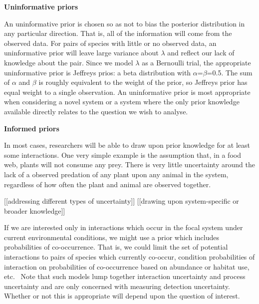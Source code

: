 \documentclass[12pt]{article}
\begin{document}
\begin{spacing}{2.0}
      \textbf{Uninformative priors}

        An uninformative prior is chosen so as not to bias the posterior distribution in any particular direction. That is, all of the information will come from the observed data. For pairs of species with little or no observed data, an uninformative prior will leave large variance about $\lambda$ and reflect our lack of knowledge about the pair. Since we model $\lambda$ as a Bernoulli trial, the appropriate uninformative prior is Jeffreys prios: a beta distribution with $\alpha$=$\beta$=0.5. The sum of $\alpha$ and $\beta$ is roughly equivalent to the weight of the prior, so Jeffreys prior has equal weight to a single observation. An uninformative prior is most appropriate when considering a novel system or a system where the only prior knowledge available directly relates to the question we wish to analyse.


      \textbf{Informed priors}

        In most cases, researchers will be able to draw upon prior knowledge for at least some interactions. One very simple example is the assumption that, in a food web, plants will not consume any prey. There is very little uncertainty around the lack of a observed predation of any plant upon any animal in the system, regardless of how often the plant and animal are observed together. 

        [[addressing different types of uncertainty]]
        [[drawing upon system-specific or broader knowledge]]

        If we are interested only in interactions which occur in the focal system under current environmental conditions, we might use a prior which includes probabilities of co-occurrence. That is, we could limit the set of potential interactions to pairs of species which currently co-occur, condition probabilities of interaction on probabilities of co-occurrence based on abundance or habitat use, etc.~\citep{Gravel2013,Weinstein2017} Note that such models lump together interaction uncertainty and process uncertainty and are only concerned with measuring detection uncertainty. Whether or not this is appropriate will depend upon the question of interest.



\end{spacing}
\end{document}
